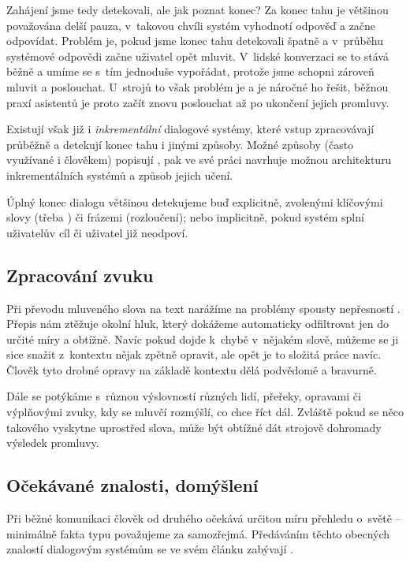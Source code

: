 Zahájení jsme tedy detekovali, ale jak poznat konec? Za konec tahu je
většinou považována delší pauza, v~takovou chvíli systém vyhodnotí odpověď
a začne odpovídat. Problém je, pokud jsme konec tahu detekovali špatně a
v~průběhu systémové odpovědi začne uživatel opět mluvit. V~lidské konverzaci
se to stává běžně a umíme se s~tím jednoduše vypořádat, protože jsme schopni
zároveň mluvit a poslouchat. U~strojů to však problém je a je náročné ho řešit,
běžnou praxí asistentů
je proto začít znovu poslouchat až po ukončení jejich promluvy.

Existují však již i \textit{inkrementální} dialogové systémy, které
vstup zpracovávají průběžně a detekují konec tahu i jinými způsoby.
Možné způsoby (často využívané i člověkem) popisují \citet{turn_taking_taxonomy_2015},
\citet{khouzaimi_turn-taking_2016} pak ve své práci navrhuje
možnou architekturu inkrementálních systémů a způsob jejich učení.

Úplný konec dialogu většinou detekujeme buď explicitně, zvolenými klíčovými
slovy (třeba ) či frázemi (rozloučení); nebo implicitně, pokud
systém splní uživatelův cíl či uživatel již neodpoví.

\subsection{Zpracování zvuku}

Při převodu mluveného slova na text narážíme na problémy spousty nepřesností \citep[sekce 4.1]{glass_challenges_1999}.
Přepis nám ztěžuje okolní hluk, který dokážeme automaticky odfiltrovat jen do určité míry
a obtížně. Navíc pokud dojde k~chybě v~nějakém slově, můžeme se ji sice snažit
z~kontextu nějak zpětně opravit, ale opět je to složitá práce navíc. Člověk
tyto drobné opravy na základě kontextu dělá podvědomě a bravurně.

Dále se potýkáme s~různou výslovností různých lidí, přeřeky, opravami
či výplňovými zvuky, kdy se mluvčí rozmýšlí, co chce říct dál. Zvláště
pokud se něco takového vyskytne uprostřed slova, může být obtížné dát
strojově dohromady výsledek promluvy.

\subsection{Očekávané znalosti, domýšlení}

Při běžné komunikaci člověk od druhého očekává určitou míru přehledu o~světě
-- minimálně fakta typu  považujeme za samozřejmá.
Předáváním těchto obecných znalostí dialogovým systémům se ve svém článku
zabývají \citet{young_augmenting_2018}.

